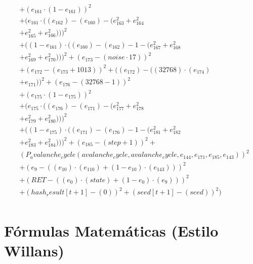 \documentclass[10pt, a4paper]{article}
\begin{document}
\begin{small}
\begin{align*}
& + (e_{161}  \cdot  (1 - e_{161}))^{2} \\
& + (e_{161}  \cdot  ((e_{162}) - (e_{160}) - (e_{163}^{2} + e_{164}^{2} \\
& + e_{165}^{2} + e_{166}^{2})))^{2} \\
& + ((1 - e_{161})  \cdot  ((e_{160}) - (e_{162}) - 1 - (e_{167}^{2} + e_{168}^{2} \\
& + e_{169}^{2} + e_{170}^{2})))^{2} + (e_{173} - (noise  \cdot  17))^{2} \\
& + (e_{172} - (e_{173} + 1013))^{2} + ((e_{172}) - ((32768)  \cdot  (e_{174}) \\
& + e_{171}))^{2} + (e_{176} - (32768 - 1))^{2} \\
& + (e_{175}  \cdot  (1 - e_{175}))^{2} \\
& + (e_{175}  \cdot  ((e_{176}) - (e_{171}) - (e_{177}^{2} + e_{178}^{2} \\
& + e_{179}^{2} + e_{180}^{2})))^{2} \\
& + ((1 - e_{175})  \cdot  ((e_{171}) - (e_{176}) - 1 - (e_{181}^{2} + e_{182}^{2} \\
& + e_{183}^{2} + e_{184}^{2})))^{2} + (e_{185} - (step + 1))^{2} + \\
& (P_avalanche_cycle(avalanche_cycle, avalanche_cycle, e_{144}, e_{171}, e_{185}, e_{143}))^{2} \\
& + (e_{9} - ((e_{10})  \cdot  (e_{110}) + (1 - e_{10})  \cdot  (e_{143})))^{2} \\
& + (RET - ((e_{0})  \cdot  (state) + (1 - e_{0})  \cdot  (e_{9})))^{2} \\
& + (hash_result[t+1] - (0))^{2} + (seed[t+1] - (seed))^{2}) \\
\end{align*}
\end{small}\part{Fórmulas Matemáticas (Estilo Willans)}
\end{document}

